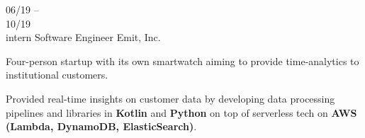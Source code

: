 \begin{entrylist}
{%
    }
    \entry
    {06/19 --        \\ 10/19        \\\footnotesize{intern}}
    {Software Engineer}
    {Emit, Inc.}
    {
        Four-person startup with its own smartwatch aiming to provide time-analytics to
        institutional customers.

        \para
        Provided real-time insights on customer data by developing data processing pipelines and libraries in
        \textbf{Kotlin} and \textbf{Python} on top of serverless tech on \textbf{AWS (Lambda,
            DynamoDB, ElasticSearch)}.
    }
\end{entrylist}
